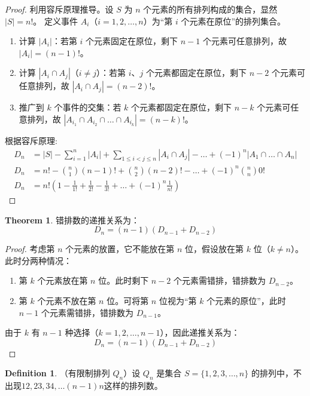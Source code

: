 \documentclass[oneside]{book}
\theoremstyle{definition}
\newtheorem{definition}{Definition}[section]
\newtheorem{theorem}{Theorem}[section]
\begin{document}
	\begin{proof}
		利用容斥原理推导。设 \( S \) 为 \( n \) 个元素的所有排列构成的集合，显然 \( |S| = n! \)。
		定义事件 \( A_i \)（\( i = 1, 2, \dots, n \)）为“第 \( i \) 个元素在原位”的排列集合。
		\begin{enumerate}
			\item 计算 \( |A_i| \)：若第 \( i \) 个元素固定在原位，剩下 \( n - 1 \) 个元素可任意排列，故 \( |A_i| = (n - 1)! \)。
			\item 计算 \( |A_i \cap A_j| \)（\( i \neq j \)）：若第 \( i \)、\( j \) 个元素都固定在原位，剩下 \( n - 2 \) 个元素可任意排列，故 \( |A_i \cap A_j| = (n - 2)! \)。
			\item 推广到 \( k \) 个事件的交集：若 \( k \) 个元素都固定在原位，剩下 \( n - k \) 个元素可任意排列，故 \( |A_{i_1} \cap A_{i_2} \cap \dots \cap A_{i_k}| = (n - k)! \)。
		\end{enumerate}
		
		根据容斥原理:
		\[
		\begin{aligned}
			D_n &= |S| - \sum_{i=1}^n |A_i| + \sum_{1 \leq i < j \leq n} |A_i \cap A_j| - \dots + (-1)^n |A_1 \cap \dots \cap A_n| \\
			D_n &= n! - \binom{n}{1}(n - 1)! + \binom{n}{2}(n - 2)! - \dots + (-1)^n \binom{n}{n} 0! \\
			D_n &= n! \left( 1 - \frac{1}{1!} + \frac{1}{2!} - \frac{1}{3!} + \dots + (-1)^n \frac{1}{n!} \right)
		\end{aligned}
		\]
	\end{proof}
	
	
	\begin{theorem}
		错排数的递推关系为：
		\[
		D_n = (n - 1)(D_{n - 1} + D_{n - 2})
		\]
	\end{theorem}
	
	\begin{proof}
		考虑第 \( n \) 个元素的放置，它不能放在第 \( n \) 位，假设放在第 \( k \) 位（\( k \neq n \)）。此时分两种情况：
		\begin{enumerate}
			\item 第 \( k \) 个元素放在第 \( n \) 位。此时剩下 \( n - 2 \) 个元素需错排，错排数为 \( D_{n - 2} \)。
			\item 第 \( k \) 个元素不放在第 \( n \) 位。可将第 \( n \) 位视为“第 \( k \) 个元素的原位”，此时 \( n - 1 \) 个元素需错排，错排数为 \( D_{n - 1} \)。
		\end{enumerate}
		由于 \( k \) 有 \( n - 1 \) 种选择（\( k = 1, 2, \dots, n - 1 \)），因此递推关系为：
		\[
		D_n = (n - 1)(D_{n - 1} + D_{n - 2})
		\]
	\end{proof}
	\begin{definition}
		（有限制排列 \(Q_n\)）设 \(Q_n\) 是集合 \(S = \{1,2,3,\dots,n\}\) 的排列中，不出现\( 12,23,34,\dots (n-1)n \)这样的排列数。
	\end{definition}
	
\end{document}

